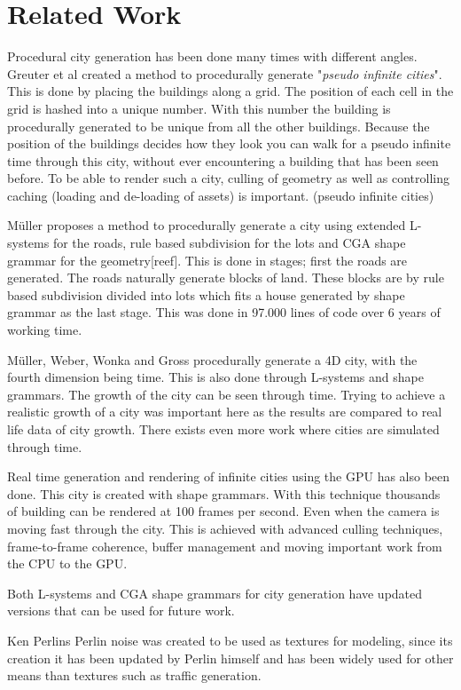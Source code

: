 \section{Related Work}
Procedural city generation has been done many times with different angles. Greuter et al\cite{PseudoInfiniteCities} created a method to procedurally generate "\textit{pseudo infinite cities}". This is done by placing the buildings along a grid. The position of each cell in the grid is hashed into a unique number. With this number the building is procedurally generated to be unique from all the other buildings. Because the position of the buildings decides how they look you can walk for a pseudo infinite time through this city, without ever encountering a building that has been seen before. To be able to render such a city, culling of geometry as well as controlling caching (loading and de-loading of assets) is important. (pseudo infinite cities)

\par 
Müller proposes a method to procedurally generate a city using extended L-systems for the roads, rule based subdivision for the lots and CGA shape grammar for the geometry[reef]. This is done in stages; first the roads are generated. The roads naturally generate blocks of land. These blocks are by rule based subdivision divided into lots which fits a house generated by shape grammar as the last stage. This was done in 97.000 lines of code over 6 years of working time. \cite{ProceduralModeling}\cite{ProceduralModeling6}

\par
Müller, Weber, Wonka and Gross procedurally generate a 4D city, with the fourth dimension being time. This is also done through L-systems and shape grammars. The growth of the city can be seen through time. Trying to achieve a realistic growth of a city was important here as the results are compared to real life data of city growth. \cite{4DCities} There exists even more work where cities are simulated through time. \cite{AutonomousTimeVarying}


\par
Real time generation and rendering of infinite cities using the GPU has also been done. This city is created with shape grammars. With this technique thousands of building can be rendered at 100 frames per second. Even when the camera is moving fast through the city. This is achieved with advanced culling techniques, frame-to-frame coherence, buffer management and moving important work from the CPU to the GPU.

\par
Both L-systems and CGA shape grammars for city generation have updated versions that can be used for future work. \cite{InteractiveProceduralStreet}\cite{AdvancedProceduralModel}

\par
Ken Perlins Perlin noise was created to be used as textures for modeling, since its creation it has been updated by Perlin himself and has been widely used for other means than textures such as traffic generation. \cite{PerlinNoise}\cite{TrafficGenerator}